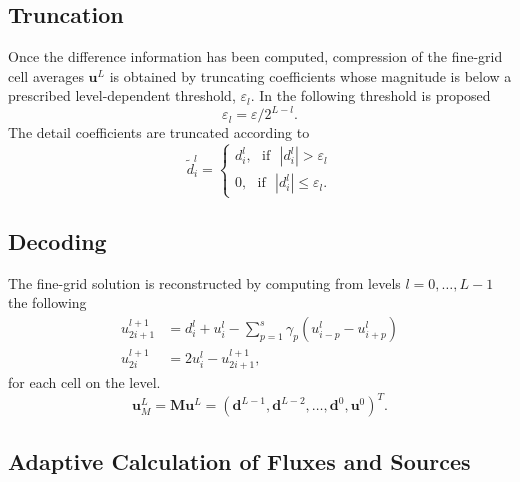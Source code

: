 \documentclass[12pt,letterpaper]{article}
\begin{document}
    \subsection*{Truncation}

        Once the difference information has been computed, compression of the
        fine-grid cell averages $\bm{u}^{L}$ is obtained by truncating
        coefficients whose magnitude is below a prescribed level-dependent
        threshold, $\varepsilon_{l}$.  In \cite{harten1994} the following
        threshold is proposed
        \begin{equation}
            \varepsilon_{l} = \varepsilon / 2^{L-l}.
        \end{equation}
        The detail coefficients are truncated according to
        \begin{equation}
            \tilde{d}^{l}_{i} =
                \begin{cases}
                    d^{l}_{i}, \text{ } \text{if} \text{ } |d^{l}_{i}| > \varepsilon_{l} \\
                    0, \text{ } \text{if} \text{ } |d^{l}_{i}| \leq \varepsilon_{l}.
                \end{cases}
        \end{equation}

    \subsection*{Decoding}

        The fine-grid solution is reconstructed by computing from levels
        $l=0,\dots,L-1$ the following
        \begin{align}
            u_{2i+1}^{l+1} & = d_{i}^{l} + u_{i}^{l} - \sum_{p=1}^{s}
            \gamma_{p} \left( u^{l}_{i-p} - u^{l}_{i+p} \right) \\
            u_{2i}^{l+1} & = 2 u_{i}^{l} - u_{2i+1}^{l+1},
        \end{align}
        for each cell on the level.
        \begin{equation}
            \bm{u}^{L}_{M} = \bm{M} \bm{u}^{L} = \left( \bm{d}^{L-1}, \bm{d}^{L-2},
            \dots, \bm{d}^{0}, \bm{u}^{0} \right)^{T}.
        \end{equation}

    \subsection*{Adaptive Calculation of Fluxes and Sources}
\end{document}

